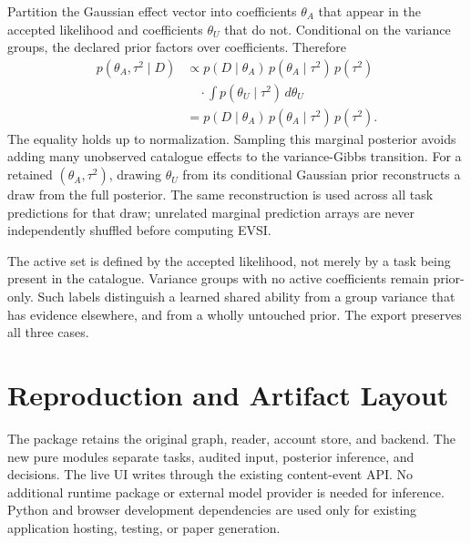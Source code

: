 Partition the Gaussian effect vector into coefficients \(\theta_A\) that
appear in the accepted likelihood and coefficients \(\theta_U\) that do not.
Conditional on the variance groups, the declared prior factors over
coefficients. Therefore
\begin{equation}
\begin{split}
 p(\theta_A,\tau^2\mid D)
 &\propto p(D\mid\theta_A)\,
          p(\theta_A\mid\tau^2)\,p(\tau^2)\\
 &\quad\cdot\int p(\theta_U\mid\tau^2)\,d\theta_U\\
 &=p(D\mid\theta_A)\,
          p(\theta_A\mid\tau^2)\,p(\tau^2).
\end{split}
\end{equation}
The equality holds up to normalization. Sampling this marginal posterior
avoids adding many unobserved catalogue
effects to the variance-Gibbs transition. For a retained
\((\theta_A,\tau^2)\), drawing \(\theta_U\) from its conditional Gaussian
prior reconstructs a draw from the full posterior. The same reconstruction
is used across all task predictions for that draw; unrelated marginal
prediction arrays are never independently shuffled before computing EVSI.

The active set is defined by the accepted likelihood, not merely by a task
being present in the catalogue. Variance groups with no active coefficients
remain prior-only. Such labels distinguish a learned shared ability from a
group variance that has evidence elsewhere, and from a wholly untouched
prior. The export preserves all three cases.

\section{Reproduction and Artifact Layout}

The package retains the original graph, reader, account store, and backend.
The new pure modules separate tasks, audited input, posterior inference,
and decisions. The live UI writes through the existing content-event API.
No additional runtime package or external model provider is needed for
inference. Python and browser development dependencies are used only for
existing application hosting, testing, or paper generation.

